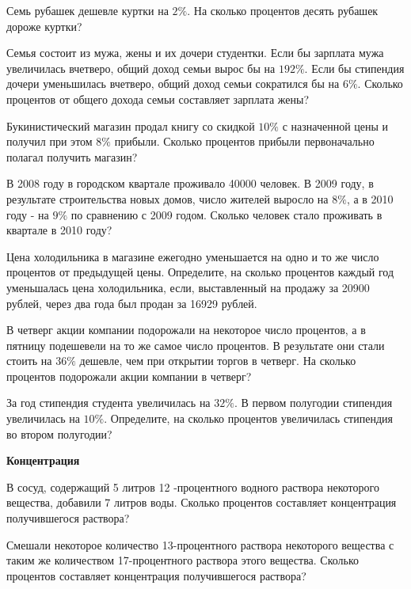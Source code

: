  Семь рубашек дешевле куртки на $2 \%$. На сколько процентов десять рубашек дороже куртки?


 Семья состоит из мужа, жены и их дочери студентки. Если бы зарплата мужа увеличилась вчетверо, общий доход семьи вырос бы на $192 \%$. Если бы стипендия дочери уменьшилась вчетверо, общий доход семьи сократился бы на $6 \%$. Сколько процентов от общего дохода семьи составляет зарплата жены?


 Букинистический магазин продал книгу со скидкой $10 \%$ с назначенной цены и получил при этом $8 \%$ прибыли. Сколько процентов прибыли первоначально полагал получить магазин?


 В 2008 году в городском квартале проживало 40000 человек. В 2009 году, в результате строительства новых домов, число жителей выросло на $8 \%$, а в 2010 году - на $9 \%$ по сравнению с 2009 годом. Сколько человек стало проживать в квартале в 2010 году?


 Цена холодильника в магазине ежегодно уменьшается на одно и то же число процентов от предыдущей цены. Определите, на сколько процентов каждый год уменьшалась цена холодильника, если, выставленный на продажу за 20900 рублей, через два года был продан за 16929 рублей.


 В четверг акции компании подорожали на некоторое число процентов, а в пятницу подешевели на то же самое число процентов. В результате они стали стоить на $36 \%$ дешевле, чем при открытии торгов в четверг. На сколько процентов подорожали акции компании в четверг?


 За год стипендия студента увеличилась на $32 \%$. В первом полугодии стипендия увеличилась на $10 \%$. Определите, на сколько процентов увеличилась стипендия во втором полугодии?


\centerline{\bf \Huge Концентрация}

 В сосуд, содержащий 5 литров 12 -процентного водного раствора некоторого вещества, добавили 7 литров воды. Сколько процентов составляет концентрация получившегося раствора?


 Смешали некоторое количество 13-процентного раствора некоторого вещества с таким же количеством 17-процентного раствора этого вещества. Сколько процентов составляет концентрация получившегося раствора?


